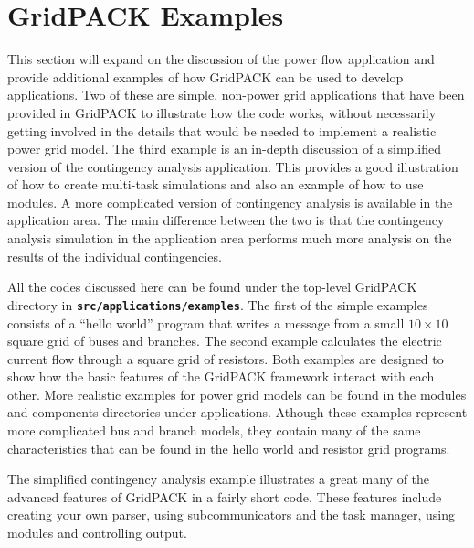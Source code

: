 \chapter{GridPACK Examples}

This section will expand on the discussion of the power flow application and
provide additional examples of how GridPACK can be used to develop applications.
Two of these are simple, non-power grid applications that have been provided in
GridPACK to illustrate how the code works, without necessarily getting involved in the details that would be needed to implement a realistic power grid model. The third example is an in-depth discussion of a simplified version of the contingency analysis application. This provides a good illustration of how to create multi-task simulations and also an example of how to use modules. A more complicated version of contingency analysis is available in the application area. The main difference between the two is that the contingency analysis simulation in the application area performs much more analysis on the results of the individual contingencies.

All the codes discussed here can be found under the top-level GridPACK directory
in\newline
\texttt{\textbf{src/applications/examples}}.
The first of the simple examples consists of a ``hello world'' program that
writes a message from a small $10 \times 10$ square grid of buses and branches.
The second example calculates the electric current flow through a square grid of
resistors. Both examples are designed to show how the basic features of the
GridPACK framework interact with each other. More realistic examples for
power grid models can be found in the modules and components directories under applications. Athough these examples represent more complicated bus and branch models, they contain many of the same characteristics that can be found in the hello world and resistor grid programs.

The simplified contingency analysis example illustrates a great many of the advanced features of GridPACK in a fairly short code. These features include creating your own parser, using subcommunicators and the task manager, using modules and controlling output.

